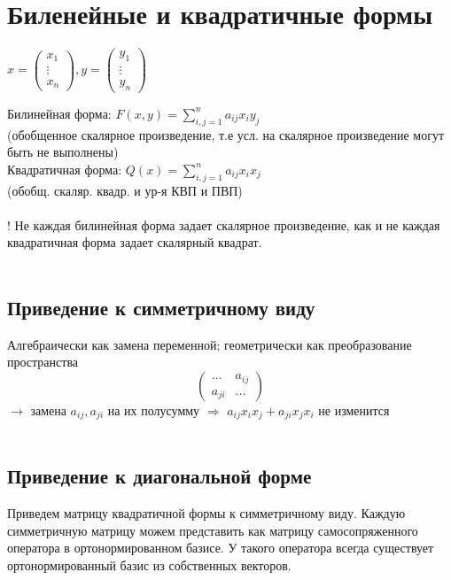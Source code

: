 \documentclass[12pt]{article}
\begin{document}
\section{Биленейные и квадратичные формы}

$x =
    \begin{pmatrix}
        x_1    \\
        \vdots \\
        x_n
    \end{pmatrix},
    y =
    \begin{pmatrix}
        y_1    \\
        \vdots \\
        y_n
    \end{pmatrix}$

Билинейная форма: $F(x, y) = \sum\limits_{i,j=1}^n a_{ij}x_iy_j$ \\
(обобщенное скалярное произведение, т.е усл. на скалярное произведение могут быть не выполнены)\\
Квадратичная форма: $Q(x) = \sum\limits_{i,j=1}^n a_{ij}x_ix_j$ \\
(обобщ. скаляр. квадр. и ур-я КВП и ПВП)\\\\
! Не каждая билинейная форма задает скалярное произведение, как и не каждая квадратичная форма задает скалярный квадрат. \\\\

\subsection{Приведение к симметричному виду}
Алгебраически как замена переменной; геометрически как преобразование пространства
\[
    \begin{pmatrix}
        ...    & a_{ij} \\
        a_{ji} & ...
    \end{pmatrix}
\]
$\rightarrow$ замена $a_{ij}, a_{ji}$ на их полусумму $\Rightarrow$
$a_{ij}x_ix_j + a_{ji}x_jx_i$ не изменится\\\\

\subsection{Приведение к диагональной форме}
Приведем матрицу квадратичной формы к симметричному виду. Каждую симметричную матрицу можем представить как матрицу самосопряженного оператора в ортонормированном базисе. У такого оператора всегда существует ортонормированный базис из собственных векторов.
\end{document}
